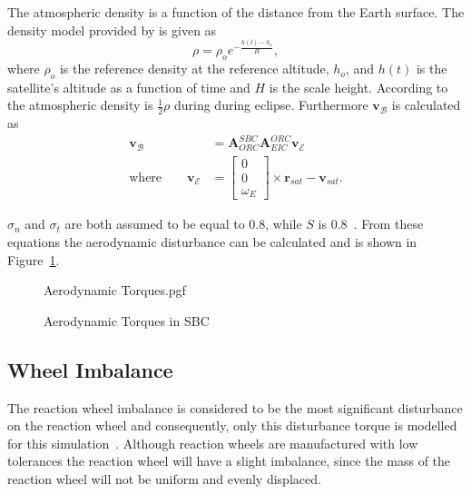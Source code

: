The atmospheric density is a function of the distance from the Earth surface. The density model provided by \cite{vallado2001fundamentals} is given as 
\begin{equation}
\rho = \rho_o e^{-\frac{h(t)-h_o}{H}},
\end{equation}
where $\rho_o$ is the reference density at the reference altitude, $h_o$, and $h(t)$ is the satellite's altitude as a function of time and $H$ is the scale height. According to \cite{steyn2011CubeSat} the atmospheric density is $\frac{1}{2}\rho$ during during eclipse. Furthermore $\mathbf{v}_{\mathcal{B}}$ is calculated as
\begin{equation}
\begin{aligned}
\mathbf{v}_{\mathcal{B}} &= \mathbf{A}_{ORC}^{SBC} \mathbf{A}_{EIC}^{ORC} \mathbf{v}_{\mathcal{E}} \\
\text{where}  \qquad \mathbf{v}_{\mathcal{E}} &= \begin{bmatrix} 0 \\ 0 \\ \omega_E \end{bmatrix} \times \mathbf{r}_{sat} - \mathbf{v}_{sat}.
\end{aligned}
\end{equation}

$\sigma_n$ and $\sigma_t$ are both assumed to be equal to 0.8, while $S$ is $\num{0.8}$~\cite{steyn2011CubeSat}. From these equations the aerodynamic disturbance can be calculated and is shown in Figure~\ref{fig:AerodynamicTorques}.
\begin{figure}[!htb]
	\centering
	\def\pgfwidth{10cm}
	{Aerodynamic Torques.pgf}
	
	\caption{Aerodynamic Torques in SBC}
	\label{fig:AerodynamicTorques}
\end{figure}

\subsection{Wheel Imbalance}
The reaction wheel imbalance is considered to be the most significant disturbance on the reaction wheel and consequently, only this disturbance torque is modelled for this simulation~\cite{bialke1998high}. Although reaction wheels are manufactured with low tolerances the reaction wheel will have a slight imbalance, since the mass of the reaction wheel will not be uniform and evenly displaced. 

